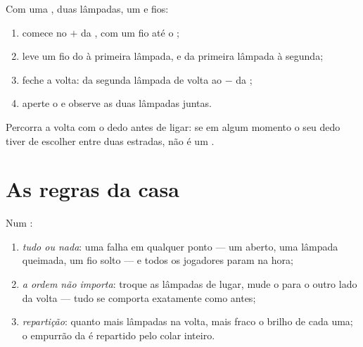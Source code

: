 \begin{method}\label{met:g4:series-circuits:build}
Com uma , duas lâmpadas, um  e fios:
\begin{enumerate}
  \item comece no  $+$ da , com um fio até o
        ;
  \item leve um fio do  à primeira lâmpada, e da primeira
        lâmpada à segunda;
  \item feche a volta: da segunda lâmpada de volta ao  $-$ da
        ;
  \item aperte o  e observe as duas lâmpadas juntas.
\end{enumerate}
Percorra a volta com o dedo antes de ligar: se em algum momento o seu
dedo tiver de escolher entre duas estradas, não é um .
\end{method}

\section{As regras da casa}

\begin{proposition}\label{prop:g4:series-circuits:rules}
Num :
\begin{enumerate}
  \item \emph{tudo ou nada}: uma falha em qualquer ponto --- um
         aberto, uma lâmpada queimada, um fio solto --- e
        todos os jogadores param na hora;
  \item \emph{a ordem não importa}: troque as lâmpadas de lugar, mude
        o  para o outro lado da volta --- tudo se comporta
        exatamente como antes;
  \item \emph{repartição}: quanto mais lâmpadas na volta, mais fraco
        o brilho de cada uma; o empurrão da  é repartido pelo
        colar inteiro.
\end{enumerate}
\end{proposition}

